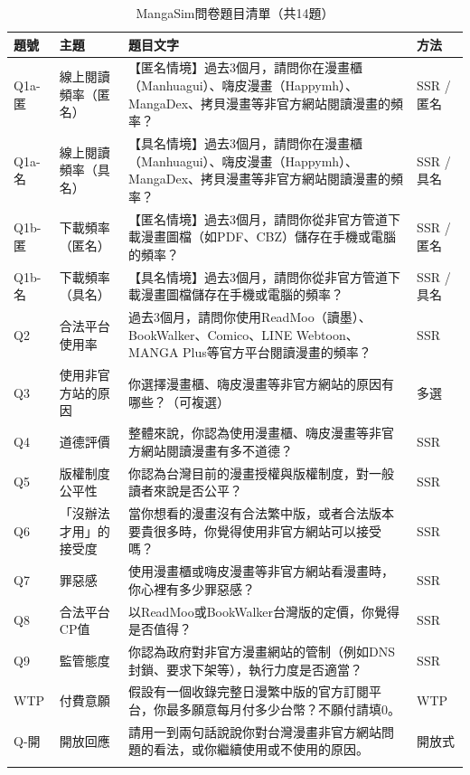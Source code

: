 \documentclass[12pt, a4paper]{article}
\begin{document}
\begin{longtable}{p{2cm}p{3cm}p{8.5cm}p{1.5cm}}
\toprule
\textbf{題號} & \textbf{主題} & \textbf{題目文字} & \textbf{方法} \\
\midrule
\endhead
Q1a-匿 & 線上閱讀頻率（匿名）
  & 【匿名情境】過去3個月，請問你在漫畫櫃（Manhuagui）、嗨皮漫畫（Happymh）、MangaDex、拷貝漫畫等非官方網站閱讀漫畫的頻率？
  & SSR / 匿名 \\[4pt]
Q1a-名 & 線上閱讀頻率（具名）
  & 【具名情境】過去3個月，請問你在漫畫櫃（Manhuagui）、嗨皮漫畫（Happymh）、MangaDex、拷貝漫畫等非官方網站閱讀漫畫的頻率？
  & SSR / 具名 \\[4pt]
Q1b-匿 & 下載頻率（匿名）
  & 【匿名情境】過去3個月，請問你從非官方管道下載漫畫圖檔（如PDF、CBZ）儲存在手機或電腦的頻率？
  & SSR / 匿名 \\[4pt]
Q1b-名 & 下載頻率（具名）
  & 【具名情境】過去3個月，請問你從非官方管道下載漫畫圖檔儲存在手機或電腦的頻率？
  & SSR / 具名 \\[4pt]
Q2 & 合法平台使用率
  & 過去3個月，請問你使用ReadMoo（讀墨）、BookWalker、Comico、LINE Webtoon、MANGA Plus等官方平台閱讀漫畫的頻率？
  & SSR \\[4pt]
Q3 & 使用非官方站的原因
  & 你選擇漫畫櫃、嗨皮漫畫等非官方網站的原因有哪些？（可複選）
  & 多選 \\[4pt]
Q4 & 道德評價
  & 整體來說，你認為使用漫畫櫃、嗨皮漫畫等非官方網站閱讀漫畫有多不道德？
  & SSR \\[4pt]
Q5 & 版權制度公平性
  & 你認為台灣目前的漫畫授權與版權制度，對一般讀者來說是否公平？
  & SSR \\[4pt]
Q6 & 「沒辦法才用」的接受度
  & 當你想看的漫畫沒有合法繁中版，或者合法版本要貴很多時，你覺得使用非官方網站可以接受嗎？
  & SSR \\[4pt]
Q7 & 罪惡感
  & 使用漫畫櫃或嗨皮漫畫等非官方網站看漫畫時，你心裡有多少罪惡感？
  & SSR \\[4pt]
Q8 & 合法平台CP值
  & 以ReadMoo或BookWalker台灣版的定價，你覺得是否值得？
  & SSR \\[4pt]
Q9 & 監管態度
  & 你認為政府對非官方漫畫網站的管制（例如DNS封鎖、要求下架等），執行力度是否適當？
  & SSR \\[4pt]
WTP & 付費意願
  & 假設有一個收錄完整日漫繁中版的官方訂閱平台，你最多願意每月付多少台幣？不願付請填0。
  & WTP \\[4pt]
Q-開 & 開放回應
  & 請用一到兩句話說說你對台灣漫畫非官方網站問題的看法，或你繼續使用或不使用的原因。
  & 開放式 \\
\bottomrule
\caption{MangaSim問卷題目清單（共14題）}
\end{longtable}
\end{document}
